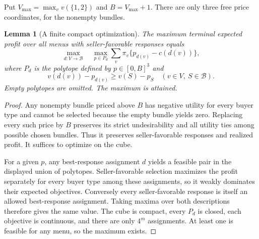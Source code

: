 \documentclass[11pt]{article}
\newtheorem{lemma}[theorem]{Lemma}
\theoremstyle{remark}
\begin{document}
Put $V_{\max}=\max_v v(\{1,2\})$ and $B=V_{\max}+1$. There are only three free price coordinates, for the nonempty bundles.

\begin{lemma}[A finite compact optimization]\label{compact}
The maximum terminal expected profit over all menus with seller-favorable responses equals
\[
 \max_{d:V\to\mathcal B}\quad
 \max_{p\in P_d}\sum_v\pi_v\{p_{d(v)}-c(d(v))\},
\]
where $P_d$ is the polytope defined by $p\in[0,B]^3$ and
\[
 v(d(v))-p_{d(v)}\geq v(S)-p_S
 \quad(v\in V,\ S\in\mathcal B).
\]
Empty polytopes are omitted. The maximum is attained.
\end{lemma}
\begin{proof}
Any nonempty bundle priced above $B$ has negative utility for every buyer type and cannot be selected because the empty bundle yields zero. Replacing every such price by $B$ preserves its strict undesirability and all utility ties among possible chosen bundles. Thus it preserves seller-favorable responses and realized profit. It suffices to optimize on the cube.

For a given $p$, any best-response assignment $d$ yields a feasible pair in the displayed union of polytopes. Seller-favorable selection maximizes the profit separately for every buyer type among these assignments, so it weakly dominates their expected objectives. Conversely every seller-favorable response is itself an allowed best-response assignment. Taking maxima over both descriptions therefore gives the same value. The cube is compact, every $P_d$ is closed, each objective is continuous, and there are only $4^m$ assignments. At least one is feasible for any menu, so the maximum exists.
\end{proof}
\end{document}
